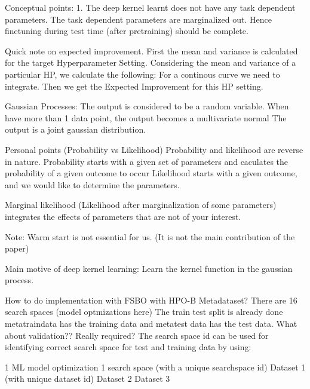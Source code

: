 \documentclass[12pt, twoside, ngerman]{report}
\begin{document}
Conceptual points:
    1. The deep kernel learnt does not have any task dependent parameters.
       The task dependent parameters are marginalized out.
       Hence finetuning during test time (after pretraining) should be complete.

Quick note on expected improvement.
    First the mean and variance is calculated for the target Hyperparameter Setting.
    Considering the mean and variance of a particular HP, we calculate the following:
        For a continous curve we need to integrate.
    Then we get the Expected Improvement for this HP setting.


Gaussian Processes:
    The output is considered to be a random variable.
    When have more than 1 data point, the output becomes a multivariate normal
        The output is a joint gaussian distribution.

Personal points (Probability vs Likelihood)
    Probability and likelihood are reverse in nature.
    Probability starts with a given set of parameters and caculates the probability of a given outcome to occur
    Likelihood starts with a given outcome, and we would like to determine the parameters.

    Marginal likelihood (Likelihood after marginalization of some parameters)
        integrates the effects of parameters that are not of your interest.

Note:
    Warm start is not essential for us. (It is not the main contribution of the paper)

Main motive of deep kernel learning:
    Learn the kernel function in the gaussian process.

How to do implementation with FSBO with HPO-B Metadataset?
There are 16 search spaces (model optmizations here)
    The train test split is already done metatraindata has the training data and metatest data has the test data.
    What about validation?? Really required?
    The search space id can be used for identifying correct search space for test and training data by using:

1 ML model optimization
    1 search space (with a unique searchspace id)
        Dataset 1 (with unique dataset id)
        Dataset 2
        Dataset 3
\end{document}
